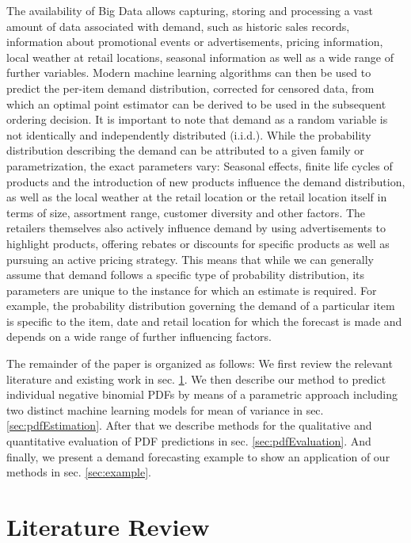 \documentclass[BCOR=1mm, DIV=calc,10pt,
twoside=true,
twocolumn,
headings=normal]{scrartcl}
\begin{document}
The availability of Big Data allows capturing, storing and processing a vast amount of data associated with demand, such as historic sales records, information about promotional events or advertisements, pricing information, local weather at retail locations, seasonal information as well as a wide range of further variables. Modern machine learning algorithms can then be used to predict the per-item demand distribution, corrected for censored data, from which an optimal point estimator can be derived to be used in the subsequent ordering decision. It is important to note that demand as a random variable is not identically and independently distributed (i.i.d.). While the probability distribution describing the demand can be attributed to a given family or parametrization, the exact parameters vary: Seasonal effects, finite life cycles of products and the introduction of new products influence the demand distribution, as well as the local weather at the retail location or the retail location itself in terms of size, assortment range, customer diversity and other factors. The retailers themselves also actively influence demand by using advertisements to highlight products, offering rebates or discounts for specific products as well as pursuing an active pricing strategy. This means that while we can generally assume that demand follows a specific type of probability distribution, its parameters are unique to the  instance for which an estimate is required. For example, the probability distribution governing the demand of a particular item is specific to the item, date and retail location for which the forecast is made and depends on a wide range of further influencing factors.

The remainder of the paper is organized as follows: We first review the relevant literature and existing work in sec. \ref{sec:LitRev}. We then describe our method to predict individual negative binomial PDFs by means of a parametric approach including two distinct machine learning models for mean of variance in sec. \ref{sec:pdfEstimation}. After that we describe methods for the qualitative and quantitative evaluation of PDF predictions in sec. \ref{sec:pdfEvaluation}. And finally, we present a demand forecasting example to show an application of our methods in sec. \ref{sec:example}.


\section{Literature Review}
\label{sec:LitRev}
\end{document}
